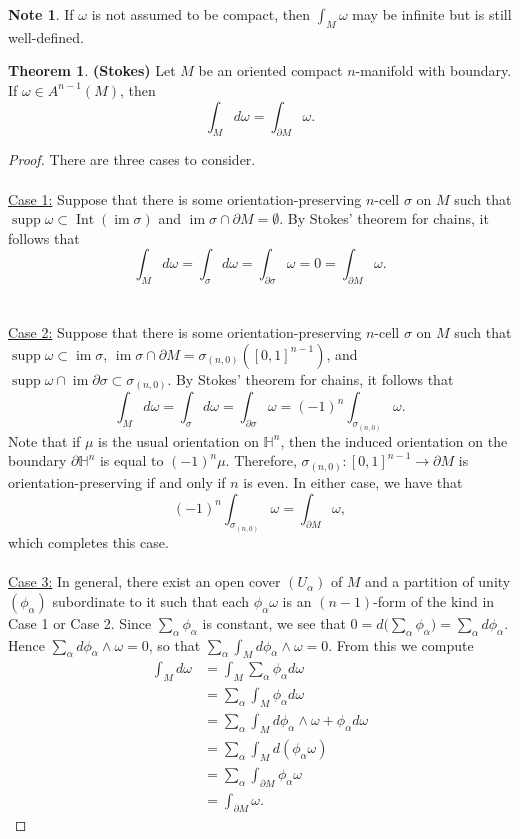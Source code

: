 \documentclass[10pt,letterpaper,cm]{nupset}
\theoremstyle{definition}
\newtheorem{theorem}{Theorem}
\newtheorem*{note}{Note}
\renewcommand{\H}{\mathbb H}
\newcommand{\1}{\mathbf{1}}
\newcommand{\0}{\vec 0}
\DeclareMathOperator{\im}{im}
\DeclareMathOperator{\Int}{Int}
\DeclareMathOperator{\supp}{supp}
\begin{document}
\begin{note}
If $\omega$ is not assumed to be compact, then $\int_M \omega$ may be infinite but is still well-defined.
\end{note}

\begin{theorem}{\textbf{(Stokes)}}
Let $M$ be an oriented compact $n$-manifold with boundary. If $\omega \in A^{n-1}(M)$, then $$ \int_M d\omega = \int_{\partial{M}} \omega  .$$
\end{theorem}
\begin{proof} There are three cases to consider.
\\ \\
\underline{Case 1:} Suppose that there is some orientation-preserving $n$-cell $\sigma$ on $M$ such that $\supp \omega \subset \Int(\im \sigma)$ and $\im \sigma \cap \partial{M} =\emptyset$. By Stokes' theorem for chains, it follows that $$\int_M d\omega  = \int_{\sigma} d\omega = \int_{\partial{\sigma}} \omega = 0 = \int_{\partial{M}} \omega    .$$
\\ \\
\underline{Case 2:} Suppose that there is some orientation-preserving $n$-cell $\sigma$ on $M$ such that $\supp \omega \subset  \im \sigma$, $\im \sigma \cap \partial{M} =\sigma_{(n,0)}([0,1]^{n-1})$, and $\supp \omega \cap \im \partial{\sigma} \subset \sigma_{(n,0)}$. By Stokes' theorem for chains, it follows that $$\int_M d\omega  = \int_{\sigma} d\omega = \int_{\partial{\sigma}} \omega = (-1)^n \int_{\sigma_{(n,0)}} \omega .$$ Note that if $\mu$ is the usual orientation on $\H^n$, then the induced orientation on the boundary $\partial{\H^n}$ is equal to $(-1)^n \mu$. Therefore, $\sigma_{(n,0)} : [0,1]^{n-1}\to \partial{M}$ is orientation-preserving  if and only if $n$ is even. In either case, we have that $$(-1)^n \int_{\sigma_{(n,0)}} \omega = \int_{\partial{M}} \omega  ,$$ which completes this case.
\\ \\
\underline{Case 3:} In general, there exist an open cover $(U_{\alpha})$ of $M$ and a partition of unity $(\phi_{\alpha})$ subordinate to it such that each $\phi_{\alpha}\omega$ is an $(n-1)$-form of the kind in Case 1 or Case 2. Since $\sum_{\alpha} \phi_{\alpha}$ is constant, we see that $0 = d\big (\sum_{\alpha} \phi_{\alpha} \big ) = \sum_{\alpha} d \phi_{\alpha}$. Hence $ \sum_{\alpha} d \phi_{\alpha} \wedge \omega =0$, so that $\sum_{\alpha} \int_M d\phi_{\alpha} \wedge \omega =0$. From this we compute
\begin{align*}
 \int_M d\omega & = \int_M \sum_{\alpha} \phi_{\alpha} d\omega 
 \\ & = \sum_{\alpha}\int_M \phi_{\alpha} d\omega
\\ & =  \sum_{\alpha}\int_M d\phi_{\alpha} \wedge \omega + \phi_{\alpha} d\omega 
\\ & =  \sum_{\alpha}\int_M d(\phi_{\alpha} \omega)
\\ & = \sum_{\alpha} \int_{\partial{M}} \phi_{\alpha} \omega 
\\ & =  \int_{\partial{M}} \omega .
\end{align*}
\end{proof}
\end{document}
